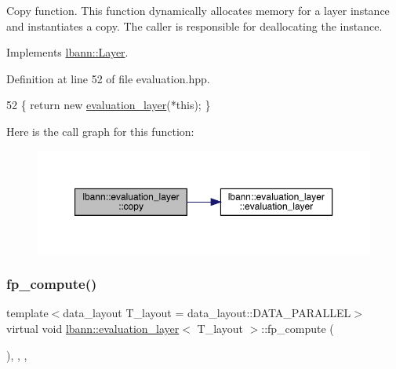 Copy function. This function dynamically allocates memory for a layer instance and instantiates a copy. The caller is responsible for deallocating the instance. 

Implements \hyperlink{classlbann_1_1Layer_af420f22bbac801c85483ade84588a23f}{lbann\+::\+Layer}.



Definition at line 52 of file evaluation.\+hpp.


\begin{DoxyCode}
52 \{ \textcolor{keywordflow}{return} \textcolor{keyword}{new} \hyperlink{classlbann_1_1evaluation__layer_a55aea0fdd91154eccbbd8a1e6a8ce5e3}{evaluation\_layer}(*\textcolor{keyword}{this}); \}
\end{DoxyCode}
Here is the call graph for this function\+:\nopagebreak
\begin{figure}[H]
\begin{center}
\leavevmode
\includegraphics[width=350pt]{classlbann_1_1evaluation__layer_a2fd584fec624d984d455ea82d92933ef_cgraph}
\end{center}
\end{figure}
\mbox{\label{classlbann_1_1evaluation__layer_a6cb3ab97ec80b6cf8606b421d9761c1c}} 
\subsubsection{\texorpdfstring{fp\+\_\+compute()}{fp\_compute()}}
{\footnotesize\ttfamily template$<$data\+\_\+layout T\+\_\+layout = data\+\_\+layout\+::\+D\+A\+T\+A\+\_\+\+P\+A\+R\+A\+L\+L\+EL$>$ \\
virtual void \hyperlink{classlbann_1_1evaluation__layer}{lbann\+::evaluation\+\_\+layer}$<$ T\+\_\+layout $>$\+::fp\+\_\+compute (\begin{DoxyParamCaption}{ }\end{DoxyParamCaption})\hspace{0.3cm}{\ttfamily [inline]}, {\ttfamily [override]}, {\ttfamily [protected]}, {\ttfamily [virtual]}}

